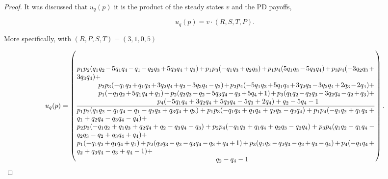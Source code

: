 \documentclass[10pt]{article}
\begin{document}
\begin{proof}

    It was discussed that \(u_q(p)\) it is the product of the steady states \(v\) and
    the PD payoffs,
    
    \[u_q(p) = v \cdot (R, S, T, P).\]
    
    More specifically, with \((R, P, S, T) = (3, 1, 0, 5)\)
    
    \begingroup
    \footnotesize
    \begin{equation}
        u_q(p) =
        \left(
          \frac
            {\parbox{6in}{$
                p_{1} p_{2} (q_{1} q_{2} - 5 q_{1} q_{4} - q_{1} - q_{2} q_{3} + 5 q_{3} q_{4} + q_{3}) + p_{1} p_{3} (- q_{1} q_{3} + q_{2} q_{3}) + p_{1} p_{4} (5 q_{1} q_{3} - 5 q_{3} q_{4}) + p_{3} p_{4} (- 3 q_{2} q_{3} + 3 q_{3} q_{4}) +$ \\
                \hspace*{1cm} $ p_{2} p_{3} (- q_{1} q_{2} + q_{1} q_{3} + 3 q_{2} q_{4} + q_{2} - 3 q_{3} q_{4} - q_{3}) + p_{2} p_{4} (- 5 q_{1} q_{3} + 5 q_{1} q_{4} + 3 q_{2} q_{3} - 3 q_{2} q_{4} + 2 q_{3} - 2 q_{4}) + $ \\
                \hspace*{1cm} $ p_{1} (- q_{1} q_{2} + 5 q_{1} q_{4} + q_{1}) + p_{2} (q_{2} q_{3} - q_{2} - 5 q_{3} q_{4} - q_{3} + 5 q_{4} + 1) + p_{3} (q_{1} q_{2} - q_{2} q_{3} - 3 q_{2} q_{4} - q_{2} + q_{3}) +$ \\
                \hspace*{4cm} $ p_{4} (- 5 q_{1} q_{4} + 3 q_{2} q_{4} + 5 q_{3} q_{4} - 5 q_{3} + 2 q_{4}) + q_{2} - 5 q_{4} - 1$
            }}
            {\parbox{6in}{$
            p_{1} p_{2} (q_{1} q_{2} - q_{1} q_{4} - q_{1} - q_{2} q_{3} + q_{3} q_{4} + q_{3}) + p_{1} p_{3} (- q_{1} q_{3} + q_{1} q_{4} + q_{2} q_{3} - q_{2} q_{4}) + p_{1} p_{4} (- q_{1} q_{2} + q_{1} q_{3} + q_{1} + q_{2} q_{4} - q_{3} q_{4} - q_{4}) +$ \\
            $ p_{2} p_{3} (- q_{1} q_{2} + q_{1} q_{3} + q_{2} q_{4} + q_{2} - q_{3} q_{4} - q_{3}) + p_{2} p_{4} (- q_{1} q_{3} + q_{1} q_{4} + q_{2} q_{3} - q_{2} q_{4}) + p_{3} p_{4} (q_{1} q_{2} - q_{1} q_{4} - q_{2} q_{3} - q_{2} + q_{3} q_{4} + q_{4}) + $ \\
            $ p_{1} (- q_{1} q_{2} + q_{1} q_{4} + q_{1}) + p_{2} (q_{2} q_{3} - q_{2} - q_{3} q_{4} - q_{3} + q_{4} + 1) + p_{3} (q_{1} q_{2} - q_{2} q_{3} - q_{2} + q_{3} - q_{4}) + p_{4} (- q_{1} q_{4} + q_{2} + q_{3} q_{4} - q_{3} + q_{4} - 1) + $ \\
            \hspace*{7cm} $q_{2} - q_{4} - 1$
          }}
        \right).
    \end{equation}
    \endgroup
    

\end{proof}
\end{document}
